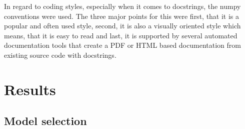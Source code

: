 In regard to coding styles, especially when it comes to docstrings, the numpy conventions were used. The three major points for this were first, that it is a popular and often used style, second, it is also a visually oriented style which means, that it is easy to read and last, it is supported by several automated documentation tools that create a PDF or HTML based documentation from existing source code with docstrings.\\


\section{Results}
\label{sec:results}

\subsection*{Model selection}

